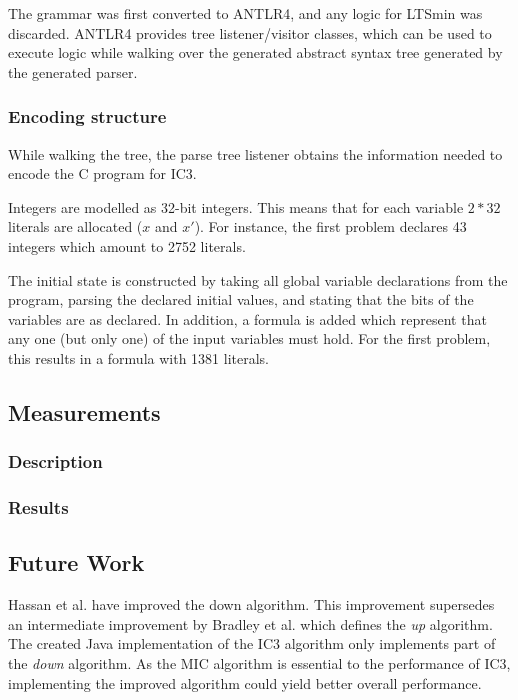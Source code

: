 \documentclass[a4paper]{article}
\begin{document}
The grammar was first converted to ANTLR4, and any logic for LTSmin was discarded.
ANTLR4 provides tree listener/visitor classes, which can be used to execute logic while walking over the generated abstract syntax tree generated by the generated parser.

\subsubsection{Encoding structure}
While walking the tree, the parse tree listener obtains the information needed to encode the C program for IC3.

Integers are modelled as 32-bit integers. This means that for each variable $2*32$ literals are allocated ($x$ and $x'$). For instance, the first problem declares 43 integers which amount to 2752 literals.

The initial state is constructed by taking all global variable declarations from the program, parsing the declared initial values, and stating that the bits of the variables are as declared. In addition, a formula is added which represent that any one (but only one) of the input variables must hold. For the first problem, this results in a formula with 1381 literals.

\subsection{Measurements}
\subsubsection{Description}
\subsubsection{Results}

\subsection{Future Work}
Hassan et al. \cite{Hassan2013} have improved the down algorithm. This improvement supersedes an intermediate improvement by Bradley et al. \cite{Bradley2007} which defines the \emph{up} algorithm. The created Java implementation of the IC3 algorithm only implements part of the \emph{down} algorithm. As the MIC algorithm is essential to the performance of IC3, implementing the improved algorithm could yield better overall performance.
\end{document}
